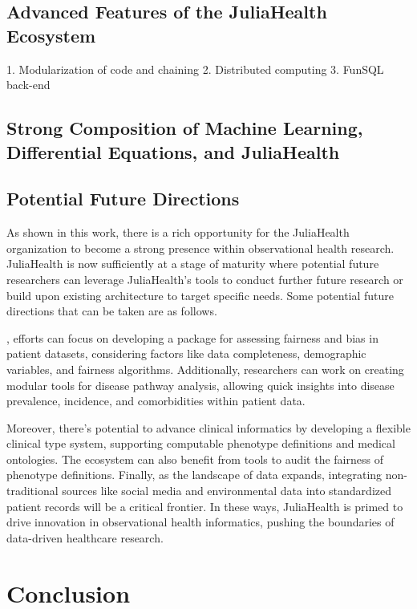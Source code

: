 \documentclass{juliacon}
\begin{document}
\subsection{Advanced Features of the JuliaHealth Ecosystem}

    1. Modularization of code and chaining
    2. Distributed computing
    3. FunSQL back-end

\subsection{Strong Composition of Machine Learning, Differential Equations, and JuliaHealth}

\subsection{Potential Future Directions}

As shown in this work, there is a rich opportunity for the JuliaHealth organization to become a strong presence within observational health research. 
JuliaHealth is now sufficiently at a stage of maturity where potential future researchers can leverage JuliaHealth's tools to conduct further future research or build upon existing architecture to target specific needs.
Some potential future directions that can be taken are as follows.

, efforts can focus on developing a package for assessing fairness and bias in patient datasets, considering factors like data completeness, demographic variables, and fairness algorithms. Additionally, researchers can work on creating modular tools for disease pathway analysis, allowing quick insights into disease prevalence, incidence, and comorbidities within patient data. 

Moreover, there's potential to advance clinical informatics by developing a flexible clinical type system, supporting computable phenotype definitions and medical ontologies. The ecosystem can also benefit from tools to audit the fairness of phenotype definitions. Finally, as the landscape of data expands, integrating non-traditional sources like social media and environmental data into standardized patient records will be a critical frontier. In these ways, JuliaHealth is primed to drive innovation in observational health informatics, pushing the boundaries of data-driven healthcare research.


\section{Conclusion}
\end{document}
